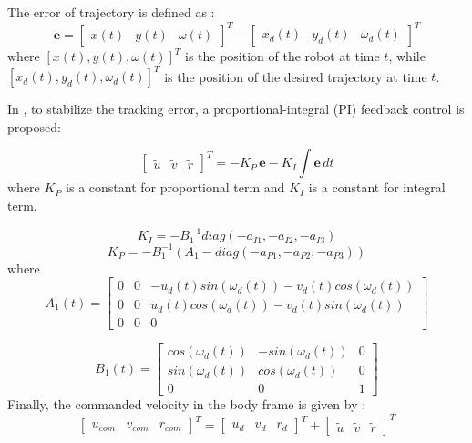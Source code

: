 \documentclass[conference]{IEEEtran}
\begin{document}
The error of trajectory is defined as :
\begin{equation*}
\boldsymbol{e} = 
\begin{bmatrix}
x(t) &
y(t) & 
\omega(t)
\end{bmatrix}^{T} - 
\begin{bmatrix}
x_d(t) &
y_d(t) & 
\omega_d(t)
\end{bmatrix}^{T}
\end{equation*}
where $[x(t), y(t), \omega(t)]^{T}$ is the position of the robot at time $t$, while $[x_d(t),y_d(t),\omega_d(t)]^{T}$ is the position of the desired trajectory at time $t$. %

In \cite{liu2008omni}, to stabilize the tracking error, a proportional-integral (PI) feedback control is proposed:

\begin{equation}
\begin{bmatrix}
\tilde{u} & \tilde{v} & \tilde{r}
\end{bmatrix}^{T} = 
-K_{P}\,\boldsymbol{e}
-K_{I}\int \boldsymbol{e}\,dt
\end{equation}
where $K_P$ is a constant for proportional term and $K_I$ is a constant for integral term.

\begin{equation}
K_{I} = -B_{1}^{-1} diag(-a_{I1}, -a_{I2}, -a_{I3})
\end{equation}
\begin{equation}
K_{P} = 
-B_{1}^{-1} 
( A_1 - diag(-a_{P1},-a_{P2},-a_{P3}))
\end{equation}
where
\begin{equation}
A_1(t)=
\begin{bmatrix}
0 & 0 & -u_d(t)sin(\omega_d(t)) - v_d(t)cos(\omega_d(t)) \\ 
0 & 0 & u_d(t)cos(\omega_d(t))-v_d(t)sin(\omega_d(t)) \\ 
0 & 0 & 0
\end{bmatrix}
\end{equation}

\begin{equation}
B_1(t) =
\begin{bmatrix}cos(\omega_d(t)) & -sin(\omega_d(t)) & 0 \\ 
sin(\omega_d(t)) & cos(\omega_d(t)) & 0 \\ 
0 & 0 & 1
\end{bmatrix}
\end{equation}
Finally, the commanded velocity in the body frame is given by :
\begin{equation}
\begin{bmatrix}
u_{com} &
v_{com} &
r_{com} 
\end{bmatrix}^{T}
=
\begin{bmatrix}
u_d &
v_d &
r_d
\end{bmatrix}^{T}
+
\begin{bmatrix}
\tilde{u} &
\tilde{v} &
\tilde{r}
\end{bmatrix}^{T}
\end{equation}
\end{document}
